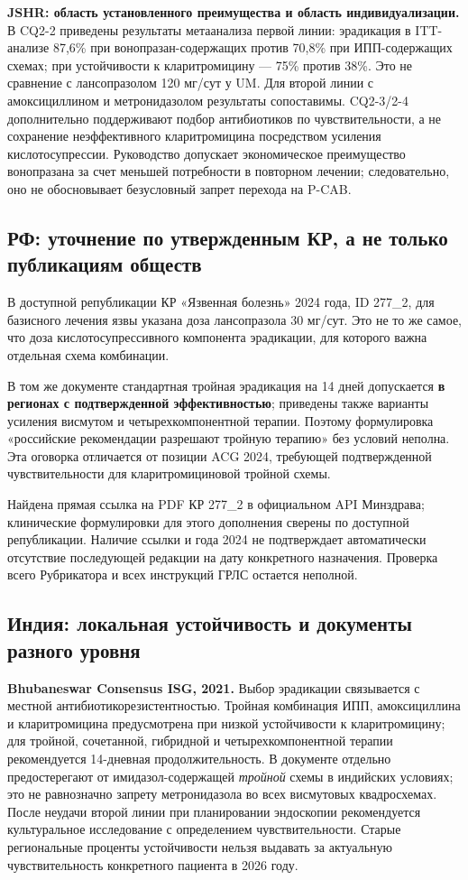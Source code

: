 \documentclass[11pt,a4paper,notitlepage]{report}
\newcommand{\src}[1]{\unskip\space\cite{#1}}
\begin{document}
\textbf{JSHR: область установленного преимущества и область индивидуализации.} В CQ2-2 приведены результаты метаанализа первой линии: эрадикация в ITT-анализе 87,6\% при вонопразан-содержащих против 70,8\% при ИПП-содержащих схемах; при устойчивости к кларитромицину --- 75\% против 38\%. Это не сравнение с лансопразолом 120 мг/сут у UM. Для второй линии с амоксициллином и метронидазолом результаты сопоставимы. CQ2-3/2-4 дополнительно поддерживают подбор антибиотиков по чувствительности, а не сохранение неэффективного кларитромицина посредством усиления кислотосупрессии. Руководство допускает экономическое преимущество вонопразана за счет меньшей потребности в повторном лечении; следовательно, оно не обосновывает безусловный запрет перехода на P-CAB.\src{jhp}

\subsection{РФ: уточнение по утвержденным КР, а не только публикациям обществ}
В доступной републикации КР «Язвенная болезнь» 2024 года, ID 277\_2, для базисного лечения язвы указана доза лансопразола 30 мг/сут. Это не то же самое, что доза кислотосупрессивного компонента эрадикации, для которого важна отдельная схема комбинации.\src{rfpudmin}

В том же документе стандартная тройная эрадикация на 14 дней допускается \textbf{в регионах с подтвержденной эффективностью}; приведены также варианты усиления висмутом и четырехкомпонентной терапии. Поэтому формулировка «российские рекомендации разрешают тройную терапию» без условий неполна. Эта оговорка отличается от позиции ACG 2024, требующей подтвержденной чувствительности для кларитромициновой тройной схемы.\src{rfpudmin,acghp}

Найдена прямая ссылка на PDF КР 277\_2 в официальном API Минздрава; клинические формулировки для этого дополнения сверены по доступной републикации. Наличие ссылки и года 2024 не подтверждает автоматически отсутствие последующей редакции на дату конкретного назначения. Проверка всего Рубрикатора и всех инструкций ГРЛС остается неполной.\src{rfpudmin,registry,grls}

\subsection{Индия: локальная устойчивость и документы разного уровня}
\textbf{Bhubaneswar Consensus ISG, 2021.} Выбор эрадикации связывается с местной антибиотикорезистентностью. Тройная комбинация ИПП, амоксициллина и кларитромицина предусмотрена при низкой устойчивости к кларитромицину; для тройной, сочетанной, гибридной и четырехкомпонентной терапии рекомендуется 14-дневная продолжительность. В документе отдельно предостерегают от имидазол-содержащей \emph{тройной} схемы в индийских условиях; это не равнозначно запрету метронидазола во всех висмутовых квадросхемах. После неудачи второй линии при планировании эндоскопии рекомендуется культуральное исследование с определением чувствительности. Старые региональные проценты устойчивости нельзя выдавать за актуальную чувствительность конкретного пациента в 2026 году.\src{indiahp}
\end{document}
